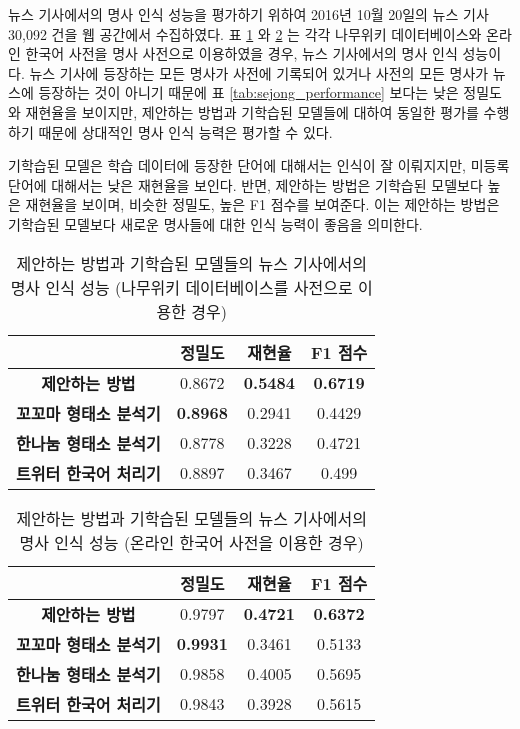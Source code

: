 \documentclass[oneside, ko,phd]{snuthesis_utf8_kor}
\begin{document}
뉴스 기사에서의 명사 인식 성능을 평가하기 위하여 2016년 10월 20일의 뉴스 기사 30,092 건을 웹 공간에서 수집하였다.
표 \ref{tab:news_namuwiki_performance} 와 \ref{tab:news_naver_performance} 는 각각 나무위키 데이터베이스와 온라인 한국어 사전을 명사 사전으로 이용하였을 경우, 뉴스 기사에서의 명사 인식 성능이다.
뉴스 기사에 등장하는 모든 명사가 사전에 기록되어 있거나 사전의 모든 명사가 뉴스에 등장하는 것이 아니기 때문에 표 \ref{tab:sejong_performance} 보다는 낮은 정밀도와 재현율을 보이지만, 제안하는 방법과 기학습된 모델들에 대하여 동일한 평가를 수행하기 때문에 상대적인 명사 인식 능력은 평가할 수 있다.

기학습된 모델은 학습 데이터에 등장한 단어에 대해서는 인식이 잘 이뤄지지만, 미등록단어에 대해서는 낮은 재현율을 보인다.
반면, 제안하는 방법은 기학습된 모델보다 높은 재현율을 보이며, 비슷한 정밀도, 높은 F1 점수를 보여준다.
이는 제안하는 방법은 기학습된 모델보다 새로운 명사들에 대한 인식 능력이 좋음을 의미한다.

\begin{table}[ht]
\centering
\caption{제안하는 방법과 기학습된 모델들의 뉴스 기사에서의 명사 인식 성능 (나무위키 데이터베이스를 사전으로 이용한 경우)}
\label{tab:news_namuwiki_performance}
\begin{tabular}{|
>{}c |c|c|c|}
\hline
& \textbf{정밀도} & \textbf{재현율} & \textbf{F1 점수} \\ \hline
\textbf{제안하는 방법} & 0.8672 & {\textbf{0.5484}} & {\textbf{0.6719}} \\ \hline
\textbf{꼬꼬마 형태소 분석기} & {\textbf{0.8968}} & 0.2941 & 0.4429 \\ \hline
\textbf{한나눔 형태소 분석기} & 0.8778 & 0.3228 & 0.4721 \\ \hline
\textbf{트위터 한국어 처리기} & 0.8897 & 0.3467 & 0.499 \\ \hline
\end{tabular}%
\end{table}

\begin{table}[ht]
\centering
\caption{제안하는 방법과 기학습된 모델들의 뉴스 기사에서의 명사 인식 성능 (온라인 한국어 사전을 이용한 경우)}
\label{tab:news_naver_performance}
\begin{tabular}{|
>{}c |c|c|c|}
\hline
& \textbf{정밀도} & \textbf{재현율} & \textbf{F1 점수} \\ \hline
\textbf{제안하는 방법} & 0.9797 & {\textbf{0.4721}} & {\textbf{0.6372}} \\ \hline
\textbf{꼬꼬마 형태소 분석기} & {\textbf{0.9931}} & 0.3461 & 0.5133 \\ \hline
\textbf{한나눔 형태소 분석기} & 0.9858 & 0.4005 & 0.5695 \\ \hline
\textbf{트위터 한국어 처리기} & 0.9843 & 0.3928 & 0.5615 \\ \hline
\end{tabular}%
\end{table}
\end{document}
